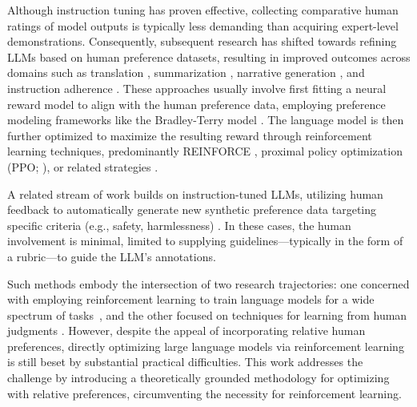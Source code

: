 Although instruction tuning has proven effective, collecting comparative human ratings of model outputs is typically less demanding than acquiring expert-level demonstrations. Consequently, subsequent research has shifted towards refining LLMs based on human preference datasets, resulting in improved outcomes across domains such as translation \citep{kreutzer-etal-2018-reliability}, summarization \citep{stiennon2022learning,ziegler2020finetuning}, narrative generation \citep{ziegler2020finetuning}, and instruction adherence \citep{ouyang2022training,ramamurthy2023is}. These approaches usually involve first fitting a neural reward model to align with the human preference data, employing preference modeling frameworks like the Bradley-Terry model \citep{bradley1952rankanalysis}. The language model is then further optimized to maximize the resulting reward through reinforcement learning techniques, predominantly REINFORCE \citep{williams1992reinforce}, proximal policy optimization (PPO; \cite{schulman2017proximal}), or related strategies \citep{ramamurthy2023is}.

A related stream of work builds on instruction-tuned LLMs, utilizing human feedback to automatically generate new synthetic preference data targeting specific criteria (e.g., safety, harmlessness) \citep{bai2022constitutional}. In these cases, the human involvement is minimal, limited to supplying guidelines—typically in the form of a rubric—to guide the LLM's annotations. 

Such methods embody the intersection of two research trajectories: one concerned with employing reinforcement learning to train language models for a wide spectrum of tasks~\citep{Ranzato2015SequenceLT,paulus2018a,wu2018learning}, and the other focused on techniques for learning from human judgments \citep{christiano2017deep,kupcsik2018learning}. However, despite the appeal of incorporating relative human preferences, directly optimizing large language models via reinforcement learning is still beset by substantial practical difficulties. This work addresses the challenge by introducing a theoretically grounded methodology for optimizing with relative preferences, circumventing the necessity for reinforcement learning.

